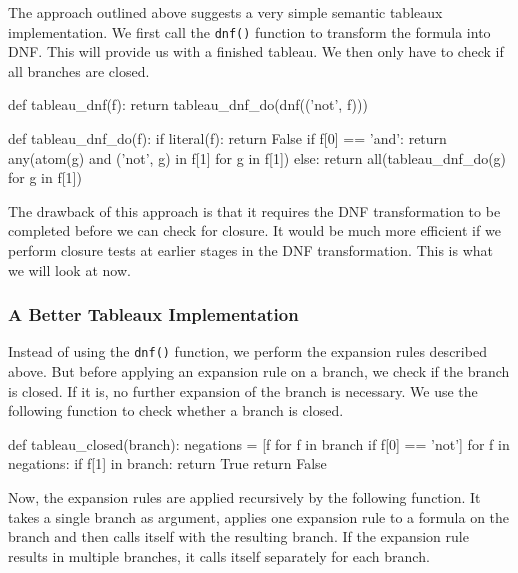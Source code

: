 \documentclass[a4paper,notitlepage]{scrartcl}
\begin{document}
The approach outlined above suggests a very simple semantic tableaux
implementation. We first call the \texttt{dnf()} function to transform the
formula into DNF. This will provide us with a finished tableau. We then only
have to check if all branches are closed.

\begin{code}
def tableau_dnf(f):
    return tableau_dnf_do(dnf(('not', f)))

def tableau_dnf_do(f):
    if literal(f):
        return False
    if f[0] == 'and':
        return any(atom(g) and ('not', g) in f[1] for g in f[1])
    else:
        return all(tableau_dnf_do(g) for g in f[1])
\end{code}

The drawback of this approach is that it requires the DNF transformation to be
completed before we can check for closure. It would be much more efficient if
we perform closure tests at earlier stages in the DNF transformation. This is
what we will look at now.

\subsubsection{A Better Tableaux Implementation}

Instead of using the \texttt{dnf()} function, we perform the expansion rules
described above. But before applying an expansion rule on a branch, we check if
the branch is closed. If it is, no further expansion of the branch is
necessary. We use the following function to check whether a branch is closed.

\begin{code}
def tableau_closed(branch):
    negations = [f for f in branch if f[0] == 'not']
    for f in negations:
        if f[1] in branch:
            return True
    return False
\end{code}

Now, the expansion rules are applied recursively by the following function. It
takes a single branch as argument, applies one expansion rule to a formula on
the branch and then calls itself with the resulting branch. If the expansion
rule results in multiple branches, it calls itself separately for each branch.
\end{document}
